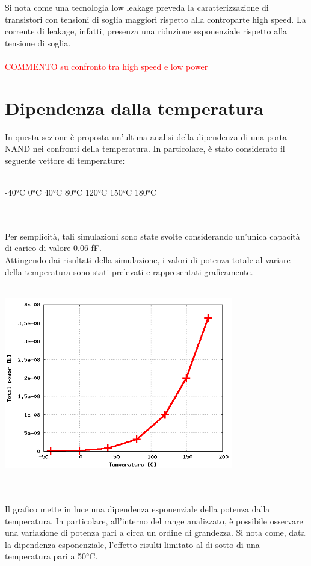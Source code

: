 \documentclass[11pt,  english, makeidx, a4paper, titlepage, oneside]{book}
\begin{document}
\vspace{0.3cm}
Si nota come una tecnologia low leakage preveda la caratterizzazione di transistori con tensioni di soglia maggiori rispetto alla controparte high speed. La corrente di leakage, infatti, presenza una riduzione esponenziale rispetto alla tensione di soglia.
\\\\
\textcolor{red}{COMMENTO su confronto tra high speed e low power}
\section{Dipendenza dalla temperatura}
In questa sezione è proposta un'ultima analisi della dipendenza di una porta NAND nei confronti della temperatura. In particolare, è stato considerato il seguente vettore di temperature:
\\\\
\centerline{-40°C  0°C   40°C   80°C   120°C   150°C   180°C}
\\\\
Per semplicità, tali simulazioni sono state svolte considerando un'unica capacità di carico di valore 0.06 fF.
\\
Attingendo dai risultati della simulazione, i valori di potenza totale al variare della temperatura sono stati prelevati e rappresentati graficamente.
\\\\
\centerline{\includegraphics[width=10cm]{./img/Lab_5/power_temp.png}}
\\\\
Il grafico mette in luce una dipendenza esponenziale della potenza dalla temperatura. In particolare, all'interno del range analizzato, è possibile osservare una variazione di potenza pari a circa un ordine di grandezza. Si nota come, data la dipendenza esponenziale, l'effetto risulti limitato al di sotto di una temperatura pari a 50°C.
\end{document}
